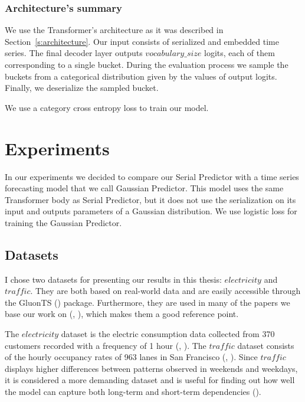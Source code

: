 \documentclass[en]{pracamgr}
\begin{document}
\subsection{Architecture's summary}

We use the Transformer's architecture as it was described in Section~\ref{s:architecture}. Our input consists of serialized and embedded time series. The final decoder layer outputs $vocabulary\_size$ logits, each of them corresponding to a single bucket. During the evaluation process we sample the buckets from a categorical distribution given by the values of output logits. Finally, we deserialize the sampled bucket.

We use a category cross entropy loss to train our model.



\chapter{Experiments}

In our experiments we decided to compare our Serial Predictor with a time series forecasting model that we call Gaussian Predictor. This model uses the same Transformer body as Serial Predictor, but it does not use the serialization on its input and outputs parameters of a Gaussian distribution. We use logistic loss for training the Gaussian Predictor.

\section{Datasets}

I chose two datasets for presenting our results in this thesis: $electricity$ and $traffic$. They are both based on real-world data and are easily accessible through the GluonTS (\cite{gluonts}) package. Furthermore, they are used in many of the papers we base our work on (\cite{enhancing}, \cite{deepar}), which makes them a good reference point.

The $electricity$ dataset is the electric consumption data collected from 370 customers recorded with a frequency of 1 hour (\cite{enhancing}, \cite{deepar}). The $traffic$ dataset consists of the hourly occupancy rates of 963 lanes in San Francisco (\cite{enhancing}, \cite{deepar}). Since $traffic$ displays higher differences between patterns observed in weekends and weekdays, it is considered a more demanding dataset and is useful for finding out how well the model can capture both long-term and short-term dependencies (\cite{enhancing}).
\end{document}
